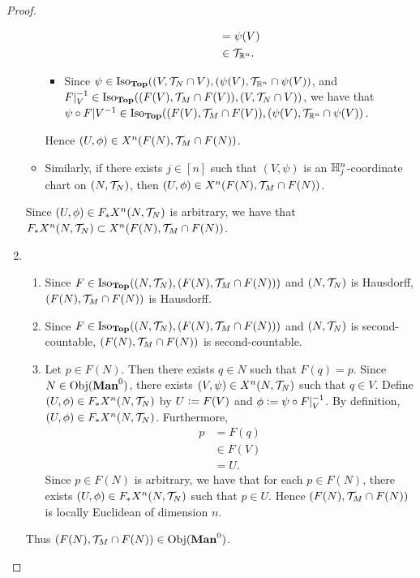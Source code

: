\documentclass{book}
\begin{document}
\begin{proof}
\begin{enumerate}
\begin{itemize}
\begin{itemize}
\begin{align*}
					& = \psi(V) \\
					& \in \mathcal{T}_{\mathbb{R}^n}.
				\end{align*}
				\item Since $\psi \in \operatorname{Iso}_{\operatorname*{\text{\textbf{Top}}}}((V, \mathcal{T}_N \cap V), (\psi(V), \mathcal{T}_{\mathbb{R}^n} \cap \psi(V))$, and $F|_V^{-1} \in \operatorname{Iso}_{\operatorname*{\text{\textbf{Top}}}}((F(V), \mathcal{T}_M \cap F(V)), (V, \mathcal{T}_N \cap V))$, we have that $\psi \circ F|V^{-1} \in \operatorname{Iso}_{\operatorname*{\text{\textbf{Top}}}}((F(V), \mathcal{T}_M \cap F(V)), (\psi(V), \mathcal{T}_{\mathbb{R}^n} \cap \psi(V))$. 
			\end{itemize}
			Hence $(U, \phi) \in X^n(F(N), \mathcal{T}_M \cap F(N))$.
			\item Similarly, if there exists $j \in [n]$ such that $(V, \psi)$ is an $\mathbb{H}^n_j$-coordinate chart on $(N, \mathcal{T}_N)$, then $(U, \phi) \in X^n(F(N), \mathcal{T}_M \cap F(N))$.
		\end{itemize}
		Since $(U, \phi) \in F_*X^n(N, \mathcal{T}_N)$ is arbitrary, we have that $F_*X^n(N, \mathcal{T}_N) \subset X^n(F(N), \mathcal{T}_M \cap F(N))$.
		\item 
		\begin{enumerate}
			\item Since $F \in \operatorname{Iso}_{\operatorname*{\text{\textbf{Top}}}}((N, \mathcal{T}_N), (F(N), \mathcal{T}_M \cap F(N)))$ and $(N, \mathcal{T}_N)$ is Hausdorff, $(F(N), \mathcal{T}_M \cap F(N))$ is Hausdorff.
			\item Since $F \in \operatorname{Iso}_{\operatorname*{\text{\textbf{Top}}}}((N, \mathcal{T}_N), (F(N), \mathcal{T}_M \cap F(N)))$ and $(N, \mathcal{T}_N)$ is second-countable, $(F(N), \mathcal{T}_M \cap F(N))$ is second-countable.
			\item Let $p \in F(N)$. Then there exists $q \in N$ such that $F(q) = p$. Since $N \in \Obj(\Man0)$, there exists $(V, \psi) \in X^n(N, \mathcal{T}_N)$ such that $q \in V$. Define $(U, \phi) \in F_*X^n(N, \mathcal{T}_N)$ by $U \vcentcolon= F(V)$ and $\phi \vcentcolon= \psi \circ F|_V^{-1}$. By definition, $(U, \phi) \in F_*X^n(N, \mathcal{T}_N)$. Furthermore,  
			\begin{align*}
				p
				& = F(q) \\
				& \in F(V) \\
				& = U.
			\end{align*}
			Since $p \in F(N)$ is arbitrary, we have that for each $p \in F(N)$, there exists $(U, \phi) \in F_*X^n(N, \mathcal{T}_N)$ such that $p \in U$. Hence $(F(N), \mathcal{T}_M \cap F(N))$ is locally Euclidean of dimension $n$. 
		\end{enumerate}
		Thus $(F(N), \MT_M \cap F(N)) \in \Obj(\Man0)$. 
	\end{enumerate}
\end{proof}
\end{document}
